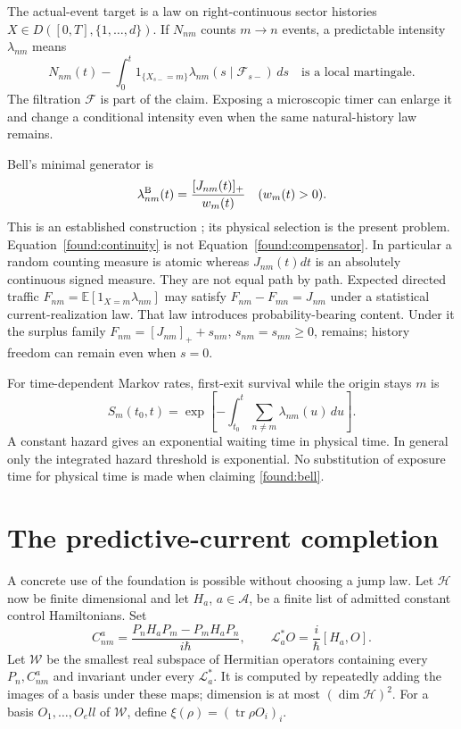 \documentclass[11pt,oneside,openany]{book}
\theoremstyle{definition}
\theoremstyle{remark}\newtheorem{remark}[theorem]{Remark}
\begin{document}
The actual-event target is a law on right-continuous sector histories $X\in D([0,T],\{1,\ldots,d\})$. If $N_{nm}$ counts $m\to n$ events, a predictable intensity $\lambda_{nm}$ means
\begin{equation}\label{found:compensator}
 N_{nm}(t)-\int_0^t1_{\{X_{s-}=m\}}\lambda_{nm}(s\mid\mathcal F_{s-})\,ds
 \quad\text{is a local martingale.}
\end{equation}
The filtration $\mathcal F$ is part of the claim. Exposing a microscopic timer can enlarge it and change a conditional intensity even when the same natural-history law remains.

Bell's minimal generator is
\begin{equation}\label{found:bell}
 \lambda^{\rm B}_{nm}(t)=\frac{[J_{nm}(t)]_+}{w_m(t)}\quad(w_m(t)>0).
\end{equation}
This is an established construction \cite{BellQFT}; its physical selection is the present problem. Equation~\eqref{found:continuity} is not Equation~\eqref{found:compensator}. In particular a random counting measure is atomic whereas $J_{nm}(t)dt$ is an absolutely continuous signed measure. They are not equal path by path. Expected directed traffic $F_{nm}=\mathbb E[1_{X=m}\lambda_{nm}]$ may satisfy $F_{nm}-F_{mn}=J_{nm}$ under a statistical current-realization law. That law introduces probability-bearing content. Under it the surplus family $F_{nm}=[J_{nm}]_++s_{nm}$, $s_{nm}=s_{mn}\ge0$, remains; history freedom can remain even when $s=0$.

For time-dependent Markov rates, first-exit survival while the origin stays $m$ is
\[
 S_m(t_0,t)=\exp\left[-\int_{t_0}^t\sum_{n\ne m}\lambda_{nm}(u)\,du\right].
\]
A constant hazard gives an exponential waiting time in physical time. In general only the integrated hazard threshold is exponential. No substitution of exposure time for physical time is made when claiming \eqref{found:bell}.

\section{The predictive-current completion}\label{found:predictive-section}
A concrete use of the foundation is possible without choosing a jump law. Let $\mathcal H$ now be finite dimensional and let $H_a$, $a\in\mathcal A$, be a finite list of admitted constant control Hamiltonians. Set
\[
 C^a_{nm}=\frac{P_nH_aP_m-P_mH_aP_n}{i\hbar},\qquad
 \mathcal L_a^*O=\frac{i}{\hbar}[H_a,O].
\]
Let $\mathcal W$ be the smallest real subspace of Hermitian operators containing every $P_n,C^a_{nm}$ and invariant under every $\mathcal L_a^*$. It is computed by repeatedly adding the images of a basis under these maps; dimension is at most $(\dim\mathcal H)^2$. For a basis $O_1,\ldots,O_ell$ of $\mathcal W$, define $\xi(\rho)=(\operatorname{tr}\rho O_i)_i$.
\end{document}

